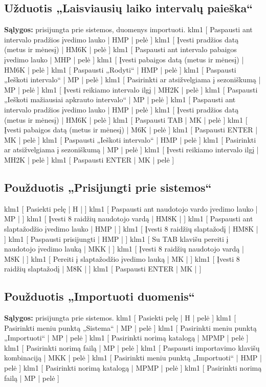\subsection{Užduotis „Laisviausių laiko intervalų paieška“}
\textbf{Sąlygos:} prisijungta prie sistemos, duomenys importuoti.
\klm
{
  klm1 [ Paspausti ant intervalo pradžios įvedimo lauko | HMP | pelė ]
  klm1 [ Įvesti pradžios datą (metus ir mėnesį) | HM6K | pelė ]
  klm1 [ Paspausti ant intervalo pabaigos įvedimo lauko | MHP | pelė ]
  klm1 [ Įvesti pabaigos datą (metus ir mėnesį) | HM6K | pelė ]
  klm1 [ Paspausti „Rodyti“ | HMP | pelė ]
  klm1 [ Paspausti „Ieškoti intervalo“ | MP | pelė ]
  klm1 [ Pasirinkti ar atsižvelgiama į sezoniškumą | MP | pelė ]
  klm1 [ Įvesti reikiamo intervalo ilgį | MH2K | pelė ]
  klm1 [ Paspausti „Ieškoti mažiausiai apkrauto intervalo“ | MP | pelė ]
}
{
  klm1 [ Paspausti ant intervalo pradžios įvedimo lauko | HMP | pelė ]
  klm1 [ Įvesti pradžios datą (metus ir mėnesį) | HM6K | pelė ]
  klm1 [ Paspausti TAB | MK | pelė ]
  klm1 [ Įvesti pabaigos datą (metus ir mėnesį) | M6K | pelė ]
  klm1 [ Paspausti ENTER | MK | pelė ]
  klm1 [ Paspausti „Ieškoti intervalo“ | HMP | pelė ]
  klm1 [ Pasirinkti ar atsižvelgiama į sezoniškumą | MP | pelė ]
  klm1 [ Įvesti reikiamo intervalo ilgį | MH2K | pelė ]
  klm1 [ Paspausti ENTER | MK | pelė ]
}

\subsection{Použduotis „Prisijungti prie sistemos“}
\klm
{
  klm1 [ Pasiekti pelę | H | ]
  klm1 [ Paspausti ant naudotojo vardo įvedimo lauko | MP | ]
  klm1 [ Įvesti 8 raidžių naudotojo vardą | HM8K | ]
  klm1 [ Paspausti ant slaptažodžio įvedimo lauko | HMP | ]
  klm1 [ Įvesti 8 raidžių slaptažodį | HM8K | ]
  klm1 [ Paspausti prisijungti | HMP | ]
}
{
  klm1 [ Su TAB klavišu pereiti į naudotojo įvedimo lauką | MKK | ]
  klm1 [ Įvesti 8 raidžių naudotojo vardą | M8K | ]
  klm1 [ Pereiti į slaptažodžio įvedimo lauką | MK | ]
  klm1 [ Įvesti 8 raidžių slaptažodį | M8K | ]
  klm1 [ Paspausti ENTER | MK | ]
}

\subsection{Použduotis „Importuoti duomenis“}
\textbf{Sąlygos:} prisijungta prie sistemos.
\klm
{
  klm1 [ Pasiekti pelę | H | pelė ]
  klm1 [ Pasirinkti meniu punktą „Sistema“ | MP | pelė ]
  klm1 [ Pasirinkti meniu punktą „Importuoti“ | MP | pelė ]
  klm1 [ Pasirinkti norimą katalogą | MPMP | pelė ]
  klm1 [ Pasirinkti norimą failą | MP | pelė ]
}
{
  klm1 [ Paspausti importavimo klavišų kombinaciją | MKK | pelė ]
  klm1 [ Pasirinkti meniu punktą „Importuoti“ | HMP | pelė ]
  klm1 [ Pasirinkti norimą katalogą | MPMP | pelė ]
  klm1 [ Pasirinkti norimą failą | MP | pelė ]
}

